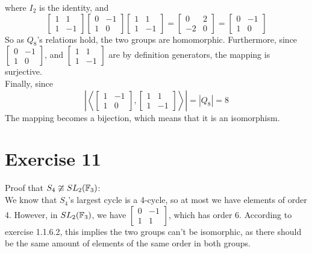 \documentclass[12pt]{article}
\begin{document}
    where $I_2$ is the identity, and
    \[ \begin{bmatrix} 1 & 1 \\ 1 & -1 \end{bmatrix}
    \begin{bmatrix} 0 & -1 \\ 1 & 0 \end{bmatrix}
    \begin{bmatrix} 1 & 1 \\ 1 & -1 \end{bmatrix}
    = \begin{bmatrix} 0 & 2 \\ -2 & 0 \end{bmatrix}
    = \begin{bmatrix} 0 & -1 \\ 1 & 0 \end{bmatrix} \]
    So as $Q_8$'s relations hold,
    the two groups are homomorphic.
    Furthermore,
    since $\begin{bmatrix} 0 & -1 \\ 1 & 0 \end{bmatrix}$,
    and $\begin{bmatrix} 1 & 1 \\ 1 & -1 \end{bmatrix}$
    are by definition generators,
    the mapping is surjective. \\
    Finally, since
    \[ \left| \left\langle \begin{bmatrix} 1 & -1 \\ 1 & 0 \end{bmatrix},
    \begin{bmatrix} 1 & 1 \\ 1 & -1 \end{bmatrix} \right\rangle \right|
    = |Q_8| = 8 \]
    The mapping becomes a bijection,
    which means that it is an isomorphism.


    \section*{Exercise 11}
    Proof that $S_4 \ncong SL_2(\mathbb{F}_3)$: \\
    We know that $S_4$'s largest cycle is a 4-cycle,
    so at most we have elements of order 4.
    However, in $SL_2(\mathbb{F}_3)$,
    we have $ \begin{bmatrix} 0 & -1 \\ 1 & 1 \end{bmatrix}$,
    which has order 6.
    According to exercise 1.1.6.2,
    this implies the two groups can't be isomorphic,
    as there should be the same amount of elements of the same
    order in both groups.
\end{document}
